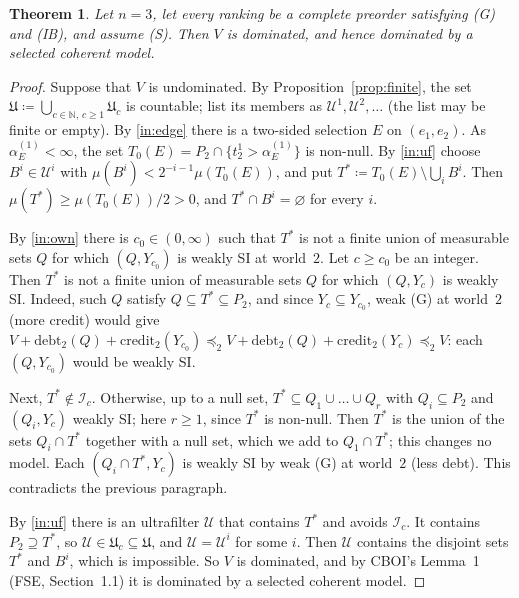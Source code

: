 \documentclass[11pt]{article}
\newtheorem{theorem}{Theorem}
\theoremstyle{definition}\newtheorem{definition}[theorem]{Definition}
\theoremstyle{remark}\newtheorem{remark}[theorem]{Remark}
\newcommand{\debt}{\mathrm{debt}}
\newcommand{\cred}{\mathrm{credit}}
\newcommand{\Iid}{\mathcal I}
\newcommand{\Uf}{\mathcal U}
\newcommand{\UU}{\mathfrak U}
\begin{document}
\begin{theorem}\label{thm:main}
Let $n=3$, let every ranking be a complete preorder satisfying (G) and
(IB), and assume (S). Then $V$ is dominated, and hence dominated by a
selected coherent model.
\end{theorem}
\begin{proof}
Suppose that $V$ is undominated. By Proposition~\ref{prop:finite}, the set
$\UU\coloneqq\bigcup_{c\in\mathbb N,\,c\ge1}\UU_c$ is countable; list its
members as $\Uf^1,\Uf^2,\dots$ (the list may be finite or empty). By
\ref{in:edge} there is a two-sided selection $E$ on $(e_1,e_2)$. As
$\alpha^{(1)}_E<\infty$, the set $T_0(E)=P_2\cap\{t^1_2>\alpha^{(1)}_E\}$ is
non-null. By \ref{in:uf} choose $B^i\in\Uf^i$ with
$\mu(B^i)<2^{-i-1}\mu(T_0(E))$, and put
$T^*\coloneqq T_0(E)\setminus\bigcup_iB^i$. Then
$\mu(T^*)\ge\mu(T_0(E))/2>0$, and $T^*\cap B^i=\varnothing$ for every $i$.

By \ref{in:own} there is $c_0\in(0,\infty)$ such that $T^*$ is not a finite
union of measurable sets $Q$ for which $(Q,Y_{c_0})$ is weakly SI at
world~$2$. Let $c\ge c_0$ be an integer. Then $T^*$ is not a finite union of
measurable sets $Q$ for which $(Q,Y_c)$ is weakly SI. Indeed, such $Q$
satisfy $Q\subseteq T^*\subseteq P_2$, and since $Y_c\subseteq Y_{c_0}$,
weak (G) at world~$2$ (more credit) would give
$V+\debt_2(Q)+\cred_2(Y_{c_0})\preceq_2V+\debt_2(Q)+\cred_2(Y_c)\preceq_2V$:
each $(Q,Y_{c_0})$ would be weakly SI.

Next, $T^*\notin\Iid_c$. Otherwise, up to a null set,
$T^*\subseteq Q_1\cup\dots\cup Q_r$ with $Q_i\subseteq P_2$ and $(Q_i,Y_c)$
weakly SI; here $r\ge1$, since $T^*$ is non-null. Then $T^*$ is the union of
the sets $Q_i\cap T^*$ together with a null set, which we add to
$Q_1\cap T^*$; this changes no model. Each $(Q_i\cap T^*,Y_c)$ is weakly SI
by weak (G) at world~$2$ (less debt). This contradicts the previous
paragraph.

By \ref{in:uf} there is an ultrafilter $\Uf$ that contains $T^*$ and avoids
$\Iid_c$. It contains $P_2\supseteq T^*$, so $\Uf\in\UU_c\subseteq\UU$, and
$\Uf=\Uf^i$ for some $i$. Then $\Uf$ contains the disjoint sets $T^*$ and
$B^i$, which is impossible. So $V$ is dominated, and by CBOI's Lemma~1
(FSE, Section~1.1) it is dominated by a selected coherent model.
\end{proof}
\end{document}
